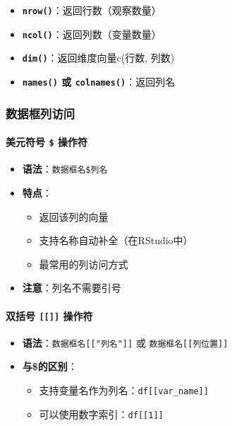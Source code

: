 \documentclass[
]{book}
\providecommand{\tightlist}{%
  \setlength{\itemsep}{0pt}\setlength{\parskip}{0pt}}
\begin{document}
\begin{itemize}
\tightlist
\item
  \textbf{\texttt{nrow()}}：返回行数（观察数量）
\item
  \textbf{\texttt{ncol()}}：返回列数（变量数量）
\item
  \textbf{\texttt{dim()}}：返回维度向量c(行数, 列数)
\item
  \textbf{\texttt{names()} 或 \texttt{colnames()}}：返回列名
\end{itemize}

\hypertarget{ux6570ux636eux6846ux5217ux8bbfux95ee}{%
\subsubsection{数据框列访问}\label{ux6570ux636eux6846ux5217ux8bbfux95ee}}

\hypertarget{ux7f8eux5143ux7b26ux53f7-ux64cdux4f5cux7b26}{%
\paragraph{\texorpdfstring{美元符号 \texttt{\$} 操作符}{美元符号 \$ 操作符}}\label{ux7f8eux5143ux7b26ux53f7-ux64cdux4f5cux7b26}}

\begin{itemize}
\tightlist
\item
  \textbf{语法}：\texttt{数据框名\$列名}
\item
  \textbf{特点}：

  \begin{itemize}
  \tightlist
  \item
    返回该列的向量
  \item
    支持名称自动补全（在RStudio中）
  \item
    最常用的列访问方式
  \end{itemize}
\item
  \textbf{注意}：列名不需要引号
\end{itemize}

\hypertarget{ux53ccux62ecux53f7-ux64cdux4f5cux7b26}{%
\paragraph{\texorpdfstring{双括号 \texttt{{[}{[}{]}{]}} 操作符}{双括号 {[}{[}{]}{]} 操作符}}\label{ux53ccux62ecux53f7-ux64cdux4f5cux7b26}}

\begin{itemize}
\tightlist
\item
  \textbf{语法}：\texttt{数据框名{[}{[}"列名"{]}{]}} 或 \texttt{数据框名{[}{[}列位置{]}{]}}
\item
  \textbf{与\$的区别}：

  \begin{itemize}
  \tightlist
  \item
    支持变量名作为列名：\texttt{df{[}{[}var\_name{]}{]}}
  \item
    可以使用数字索引：\texttt{df{[}{[}1{]}{]}}
  \end{itemize}
\end{itemize}
\end{document}
